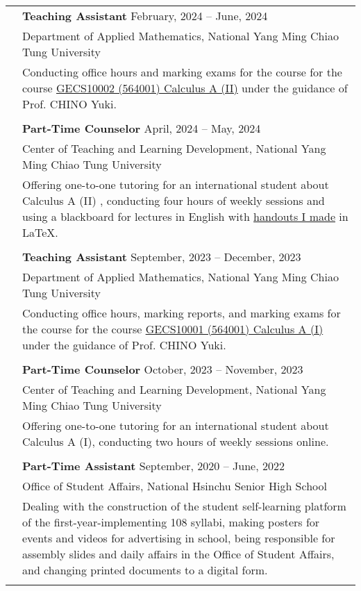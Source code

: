 \documentclass[letterpaper, 11pt]{article}
\begin{document}
\begin{center}
\begin{longtable}{p{0.76in}p{5.93in}}
        & \textbf{Teaching Assistant}  \hfill February, 2024 -- June, 2024 \\
         
        & Department of Applied Mathematics, National Yang Ming Chiao Tung University\\
        & Conducting office hours and marking exams for the course for the course \href{https://reurl.cc/RqoMez}{GECS10002 (564001) Calculus A (II)} under the guidance of Prof. CHINO Yuki. \\
        & \\
        
        & \textbf{Part-Time Counselor} \hfill April, 2024 -- May, 2024 \\
        & Center of Teaching and Learning Development, National Yang Ming Chiao Tung University\\
        & Offering one-to-one tutoring for an international student about Calculus A (II) , conducting four hours of weekly sessions and using a blackboard for lectures in English with \href{https://github.com/eiken59/2024_II_Tutor}{handouts I made} in \LaTeX.\\
        & \\

        & \textbf{Teaching Assistant} \hfill September, 2023 -- December, 2023 \\
        & Department of Applied Mathematics, National Yang Ming Chiao Tung University\\
        & Conducting office hours, marking reports, and marking exams for the course for the course \href{https://reurl.cc/Djp5jN}{GECS10001 (564001) Calculus A (I)} under the guidance of Prof. CHINO Yuki.\\
        & \\

        & \textbf{Part-Time Counselor} \hfill October, 2023 -- November, 2023 \\
        & Center of Teaching and Learning Development, National Yang Ming Chiao Tung University\\
        & Offering one-to-one tutoring for an international student about Calculus A (I), conducting two hours of weekly sessions online.\\
        & \\
        
        & \textbf{Part-Time Assistant} \hfill September, 2020 -- June, 2022 \\
        & Office of Student Affairs, National Hsinchu Senior High School\\
        & Dealing with the construction of the student self-learning platform of the first-year-implementing 108 syllabi, making posters for events and videos for advertising in school, being responsible for assembly slides and daily affairs in the Office of Student Affairs, and changing printed documents to a digital form.\\
        & \\


\end{longtable}
\end{center}
\end{document}
